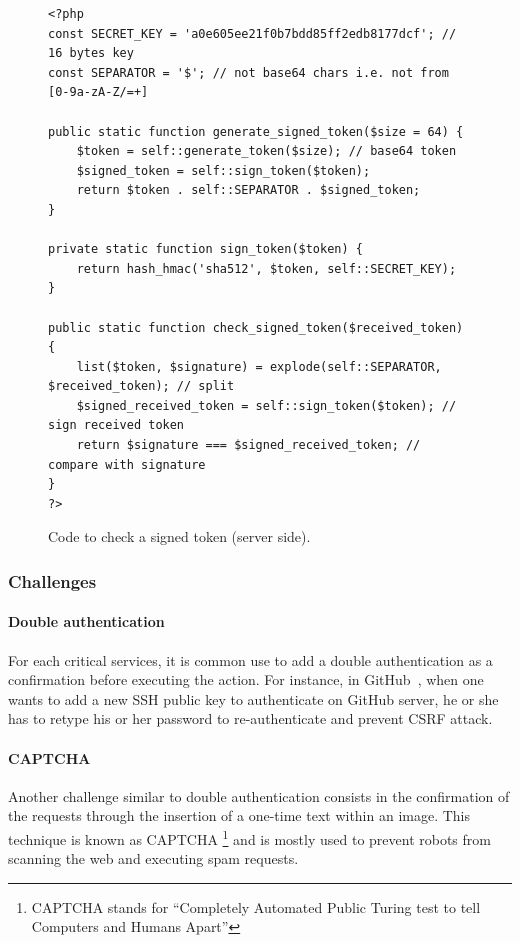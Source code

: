 \documentclass[a4paper,11pt,openany]{report}
\begin{document}
  \begin{figure}[ht!]
  \begin{verbatim}
<?php
const SECRET_KEY = 'a0e605ee21f0b7bdd85ff2edb8177dcf'; // 16 bytes key
const SEPARATOR = '$'; // not base64 chars i.e. not from [0-9a-zA-Z/=+]

public static function generate_signed_token($size = 64) {
    $token = self::generate_token($size); // base64 token
    $signed_token = self::sign_token($token);
    return $token . self::SEPARATOR . $signed_token;
}

private static function sign_token($token) {
    return hash_hmac('sha512', $token, self::SECRET_KEY);
}
  
public static function check_signed_token($received_token) {
    list($token, $signature) = explode(self::SEPARATOR, $received_token); // split
    $signed_received_token = self::sign_token($token); // sign received token
    return $signature === $signed_received_token; // compare with signature
}
?>
  \end{verbatim}
  \caption{Code to check a signed token (server side).}
  \label{figure:signed_token_server}
  \end{figure}
  
  \subsubsection{Challenges}
  
  \paragraph{Double authentication}
  For each critical services, it is common use to add a double authentication as a confirmation 
  before executing the action. For instance, in GitHub~\cite{github}, when one wants to add a new 
  SSH public key to authenticate on GitHub server, he or she has to retype his or her password to 
  re-authenticate and prevent CSRF attack.
  
  \paragraph{CAPTCHA}
  Another challenge similar to double authentication consists in the confirmation of the requests 
  through the insertion of a one-time text within an image. This technique is known as CAPTCHA
  \footnote{CAPTCHA stands for ``Completely Automated Public Turing test to tell Computers and 
  Humans Apart''} and is mostly used to prevent robots from scanning the web and executing spam 
  requests.
  
\end{document}
